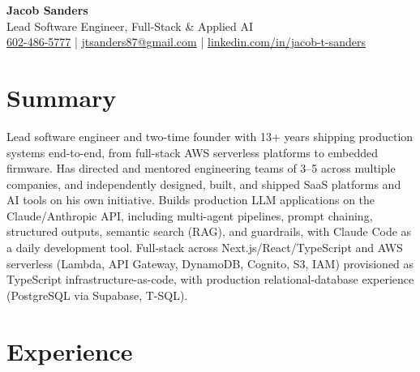 \documentclass[10.5pt, letterpaper]{article}
\begin{document}
\begin{center}
  {\fontsize{28}{32}\selectfont\bfseries\color{accent} Jacob Sanders}\\[5pt]
  {\large\color{muted} Lead Software Engineer, Full-Stack \& Applied AI}\\[8pt]
  \small
  \faPhone\enspace \href{tel:6024865777}{602-486-5777}
  \enspace\textcolor{accent}{|}\enspace
  \faEnvelope\enspace \href{mailto:jtsanders87@gmail.com}{jtsanders87@gmail.com}
  \enspace\textcolor{accent}{|}\enspace
  \faLinkedin\enspace \href{https://linkedin.com/in/jacob-t-sanders}{linkedin.com/in/jacob-t-sanders}
\end{center}

\vspace{2pt}

\section{Summary}

Lead software engineer and two-time founder with 13+ years shipping production
systems end-to-end, from full-stack AWS serverless platforms to embedded
firmware. Has directed and mentored engineering teams of 3--5 across multiple
companies, and independently designed, built, and shipped SaaS platforms and AI
tools on his own initiative. Builds production LLM applications on the
Claude/Anthropic API, including multi-agent pipelines, prompt chaining,
structured outputs, semantic search (RAG), and guardrails, with Claude Code as
a daily development tool. Full-stack across Next.js/React/TypeScript and AWS
serverless (Lambda, API Gateway, DynamoDB, Cognito, S3, IAM) provisioned as
TypeScript infrastructure-as-code, with production relational-database
experience (PostgreSQL via Supabase, T-SQL).

\section{Experience}
\end{document}
